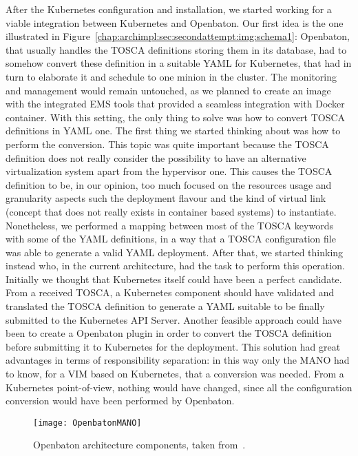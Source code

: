After the Kubernetes configuration and installation, we started working for a
viable integration between Kubernetes and Openbaton. Our first idea is the one
illustrated in Figure~\ref{chap:archimpl:sec:secondattempt:img:schema1}:
Openbaton, that usually handles the TOSCA definitions storing them in its
database, had to somehow convert these definition in a suitable YAML for
Kubernetes, that had in turn to elaborate it and schedule to one minion in the
cluster. The monitoring and management would remain untouched, as we planned to
create an image with the integrated EMS tools that provided a seamless
integration with Docker container. With this setting, the only thing to solve
was how to convert TOSCA definitions in YAML one. The first thing we started
thinking about was how to perform the conversion. This topic was quite important
because the TOSCA definition does not really consider the possibility to have an
alternative virtualization system apart from the hypervisor one. This causes the
TOSCA definition to be, in our opinion, too much focused on the resources usage
and granularity aspects such the deployment flavour and the kind of virtual link
(concept that does not really exists in container based systems) to instantiate.
Nonetheless, we performed a mapping between most of the TOSCA keywords with some
of the YAML definitions, in a way that a TOSCA configuration file was able to
generate a valid YAML deployment. After that, we started thinking instead who,
in the current architecture, had the task to perform this operation. Initially
we thought that Kubernetes itself could have been a perfect candidate. From a
received TOSCA, a Kubernetes component should have validated and translated the
TOSCA definition to generate a YAML suitable to be finally submitted to the
Kubernetes API Server. Another feasible approach could have been to create a
Openbaton plugin in order to convert the TOSCA definition before submitting it
to Kubernetes for the deployment. This solution had great advantages in terms of
responsibility separation: in this way only the MANO had to know, for a VIM
based on Kubernetes, that a conversion was needed. From a Kubernetes
point-of-view, nothing would have changed, since all the configuration
conversion would have been performed by Openbaton.

\begin{figure}[t]
  \centering
  \texttt{[image: OpenbatonMANO]}
  \caption[Openbaton architecture components]{Openbaton architecture components,
    taken from~\cite{openbatondocumentation}.}
  \label{chap:archimpl:sec:secondattempt:img:openbatonMANO}
\end{figure}

